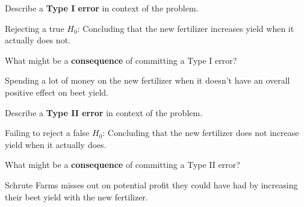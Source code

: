 \documentclass[noanswers]{exam}
\begin{document}
\begin{questions}
\begin{solution}[\stretch{1}]
\end{solution}

\question Describe a \textbf{Type I error} in context of the problem.

\begin{solution}[\stretch{1}]

\vspace{1mm}

Rejecting a true $H_0$: Concluding that the new fertilizer increases yield when it actually does not.

\vspace{1mm}

\end{solution}

\question What might be a \textbf{consequence} of committing a Type I error?

\begin{solution}[\stretch{1}]

\vspace{1mm}

Spending a lot of money on the new fertilizer when it doesn't have an overall positive effect on beet yield.

\vspace{1mm}

\end{solution}

\question Describe a \textbf{Type II error} in context of the problem.

\begin{solution}[\stretch{1}]

\vspace{1mm}

Failing to reject a false $H_0$: Concluding that the new fertilizer does not increase yield when it actually does.

\vspace{1mm}

\end{solution}

\question What might be a \textbf{consequence} of committing a Type II error?

\begin{solution}[\stretch{1}]

\vspace{1mm}

Schrute Farms misses out on potential profit they could have had by increasing their beet yield with the new fertilizer.

\vspace{1mm}


\end{solution}
\end{questions}
\end{document}
